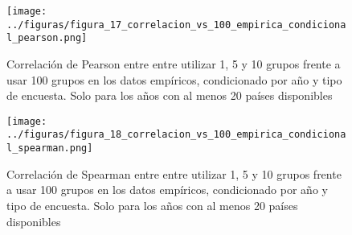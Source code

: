 \begin{figure}[H] %
    \centering %
    \texttt{[image: ../figuras/figura\_17\_correlacion\_vs\_100\_empirica\_condicional\_pearson.png]} %
    \caption{Correlación de Pearson entre entre utilizar 1, 5 y 10 grupos frente a usar 100 grupos en los datos empíricos, condicionado por año y tipo de encuesta. Solo para los años con al menos 20 países disponibles}
    \label{fig:17} %
\end{figure}

\begin{figure}[H] %
    \centering %
    \texttt{[image: ../figuras/figura\_18\_correlacion\_vs\_100\_empirica\_condicional\_spearman.png]} %
    \caption{Correlación de Spearman entre entre utilizar 1, 5 y 10 grupos frente a usar 100 grupos en los datos empíricos, condicionado por año y tipo de encuesta. Solo para los años con al menos 20 países disponibles}
    \label{fig:18} %
\end{figure}

